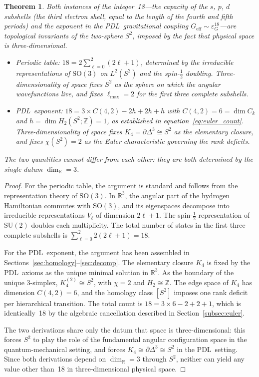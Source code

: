 \documentclass[11pt,a4paper]{article}
\newtheorem{theorem}{Theorem}[section]
\theoremstyle{definition}
\newcommand{\PDL}{\textnormal{PDL}}
\newcommand{\epsg}{\varepsilon_G}
\newcommand{\Kfour}{K_4}
\begin{document}
\begin{theorem}
  \label{thm:common_ancestor}
  Both instances of the integer~18---the capacity of the $s$, $p$, $d$ subshells (the third electron shell, equal to the length of the fourth and fifth periods) and the exponent in the \PDL\ gravitational coupling $G_{\mathrm{eff}} \sim \epsg^{18}$---are topological invariants of the two-sphere $S^2$, imposed by the fact that physical space is three-dimensional.
  \begin{itemize}
    \item \emph{Periodic table:} $18 = 2\sum_{\ell=0}^{2}(2\ell+1)$, determined by the irreducible representations of $\mathrm{SO}(3)$ on $L^2(S^2)$ and the spin-$\tfrac{1}{2}$ doubling. Three-dimensionality of space fixes $S^2$ as the sphere on which the angular wavefunctions live, and fixes $\ell_{\max} = 2$ for the first three complete subshells.
    \item \emph{\PDL\ exponent:} $18 = 3 \times C(4,2) - 2h + 2h + h$ with $C(4,2) = 6 = \dim C_k$ and $h = \dim H_2(S^2;\mathbb{Z}) = 1$, as established in equation~\eqref{eq:euler_count}. Three-dimensionality of space fixes $\Kfour = \partial\Delta^3 \cong S^2$ as the elementary closure, and fixes $\chi(S^2) = 2$ as the Euler characteristic governing the rank deficits.
  \end{itemize}
  The two quantities cannot differ from each other: they are both determined by the single datum $\dim_{\mathbb{R}} = 3$.
\end{theorem}

\begin{proof}
For the periodic table, the argument is standard and follows from the representation theory of $\mathrm{SO}(3)$.\cite{Fulton_Harris_1991} In $\mathbb{R}^3$, the angular part of the hydrogen Hamiltonian commutes with $\mathrm{SO}(3)$, and its eigenspaces decompose into irreducible representations $V_\ell$ of dimension $2\ell+1$. The spin-$\tfrac{1}{2}$ representation of $\mathrm{SU}(2)$ doubles each multiplicity. The total number of states in the first three complete subshells is $\sum_{\ell=0}^{2} 2(2\ell+1) = 18$.

For the \PDL\ exponent, the argument has been assembled in Sections~\ref{sec:homology}--\ref{sec:decomp}. The elementary closure $\Kfour$ is fixed by the \PDL\ axioms as the unique minimal solution in $\mathbb{R}^3$. As the boundary of the unique $3$-simplex, $\Kfour^{(2)} \cong S^2$, with $\chi = 2$ and $H_2 \cong \mathbb{Z}$. The edge space of $\Kfour$ has dimension $C(4,2) = 6$, and the homology class $[S^2]$ imposes one rank deficit per hierarchical transition. The total count is $18 = 3 \times 6 - 2 + 2 + 1$, which is identically~18 by the algebraic cancellation described in Section~\ref{subsec:euler}.

The two derivations share only the datum that space is three-dimensional: this forces $S^2$ to play the role of the fundamental angular configuration space in the quantum-mechanical setting, and forces $\Kfour \cong \partial\Delta^3 \cong S^2$ in the \PDL\ setting. Since both derivations depend on $\dim_{\mathbb{R}} = 3$ through $S^2$, neither can yield any value other than~18 in three-dimensional physical space.
\end{proof}
\end{document}
